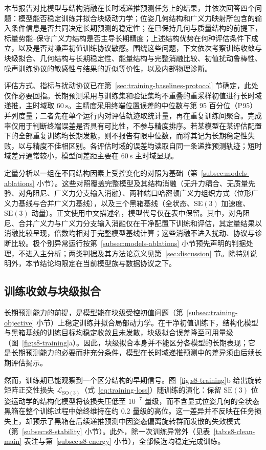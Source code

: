 \documentclass[UTF8,zihao=-4]{ctexrep}
\newcommand{\SO}{\mathrm{SO}}
\newcommand{\SE}{\mathrm{SE}}
\begin{document}
本节报告对比模型与结构消融在长时域递推预测任务上的结果，并依次回答四个问题：模型能否稳定训练并拟合块级动力学；位姿几何结构和广义力映射所包含的输入条件信息是否共同决定长期预测的稳定性；在已保持几何与质量结构的前提下，标量势能--保守广义力结构是否主导长期精度；上述结构优势在何种评估条件下成立，以及是否对噪声初值训练协议敏感。围绕这些问题，下文依次考察训练收敛与块级拟合、几何结构与长期稳定性、能量结构与完整消融比较、初值扰动鲁棒性、噪声训练协议的敏感性与结果的近似等价性，以及内部物理诊断。

评估方式、指标与扰动协议已在第~\ref{sec:training-baselines-protocol} 节确定，此处仅作必要回指。长期预测采用与训练集和验证集均不重叠的重采样初值进行长时域递推，主时域取 \(60~\mathrm{s}\)。主精度采用终端位置误差的中位数与第 95 百分位（P95）并列度量；二者先在单个运行内对评估轨迹取统计量，再在重复训练间聚合。完成率仅用于判断终端误差是否具有可比性，不参与精度排序。若某模型在某评估配置下的全部重复训练均长期发散，则不报告有限中位数，而将其记为长期稳定性失败，以与精度不佳相区别。各评估时域的误差均读取自同一条递推预测轨迹；短时域差异通常较小，模型间差距主要在 \(60~\mathrm{s}\) 主时域显现。

定量分析以一组在不同结构因素上受控变化的对照为基础（第~\ref{subsec:models-ablations} 小节）。这些对照覆盖完整模型及其结构消融（无升力耦合、无质量先验、对角阻尼、广义力分支输入消融）、两种端口哈密顿广义力组织方式（位形广义力基线与合并广义力基线），以及三个黑箱基线（全状态、\(\SE(3)\) 加速度、\(\SE(3)\) 动量）。正文使用中文描述名，模型代号仅在表中保留。其中，对角阻尼、合并广义力与广义力分支输入消融仅在干净配置下训练和评估，其定量结果以消融比较呈现，倍数均相对于完整模型基线计算；这些消融不进入扰动、协议与诊断比较。极个别异常运行按第~\ref{subsec:models-ablations} 小节预先声明的判据处理，不进入主分析；两类判据及其方法论意义见第~\ref{sec:discussion} 节。除特别说明外，本节结论均限定在当前模型族与数据协议之下。

\subsection{训练收敛与块级拟合}

长期预测能力的前提，是模型能在块级受控初值问题（第~\ref{subsec:training-objective} 小节）上稳定训练并拟合局部动力学。在干净初值训练下，结构化模型与黑箱基线的训练目标均稳定收敛且未发散，块级拟合误差降至可用量级（图~\ref{fig:s8-training}a）。因此，块级拟合本身并不能区分各模型的长期表现；它是长期预测能力的必要而非充分条件，模型在长时域递推预测中的差异须由后续长期评估揭示。

然而，训练期已能观察到一个区分结构的早期信号。图~\ref{fig:s8-training}b 给出旋转矩阵正交性损失 \(\mathcal{L}_{\SO(3)}\)（式~\eqref{eq:training-loss}）随训练的演化：保留 \(\SE(3)\) 位姿运动学的结构化模型将该损失压低至 \(10^{-7}\) 量级，而不含显式位姿几何的全状态黑箱在整个训练过程中始终维持在约 \(0.2\) 量级的高位。这一差异并不反映在任务损失上，却预示了黑箱在后续递推预测中因姿态偏离旋转群而发散的失效模式（第~\ref{subsec:s8-stability} 小节）。此外，除一次训练异常外（见表~\ref{tab:s8-clean-main} 表注与第~\ref{subsec:s8-energy} 小节），全部候选均稳定完成训练。
\end{document}
